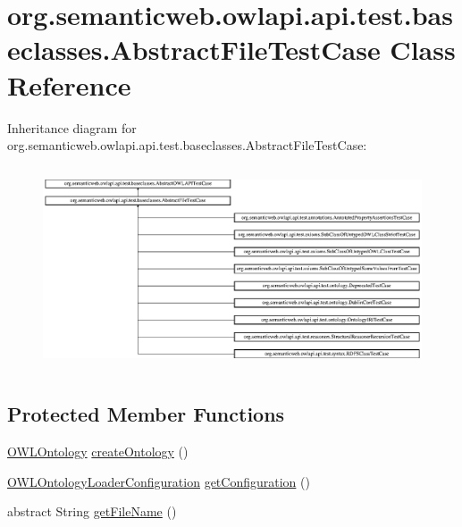 \hypertarget{classorg_1_1semanticweb_1_1owlapi_1_1api_1_1test_1_1baseclasses_1_1_abstract_file_test_case}{\section{org.\-semanticweb.\-owlapi.\-api.\-test.\-baseclasses.\-Abstract\-File\-Test\-Case Class Reference}
\label{classorg_1_1semanticweb_1_1owlapi_1_1api_1_1test_1_1baseclasses_1_1_abstract_file_test_case}
}
Inheritance diagram for org.\-semanticweb.\-owlapi.\-api.\-test.\-baseclasses.\-Abstract\-File\-Test\-Case\-:\begin{figure}[H]
\begin{center}
\leavevmode
\includegraphics[height=6.051081cm]{classorg_1_1semanticweb_1_1owlapi_1_1api_1_1test_1_1baseclasses_1_1_abstract_file_test_case}
\end{center}
\end{figure}
\subsection*{Protected Member Functions}
\begin{DoxyCompactItemize}
\item 
\hyperlink{interfaceorg_1_1semanticweb_1_1owlapi_1_1model_1_1_o_w_l_ontology}{O\-W\-L\-Ontology} \hyperlink{classorg_1_1semanticweb_1_1owlapi_1_1api_1_1test_1_1baseclasses_1_1_abstract_file_test_case_ada0f75fd23a5d611869498dd6be5f766}{create\-Ontology} ()
\item 
\hyperlink{classorg_1_1semanticweb_1_1owlapi_1_1model_1_1_o_w_l_ontology_loader_configuration}{O\-W\-L\-Ontology\-Loader\-Configuration} \hyperlink{classorg_1_1semanticweb_1_1owlapi_1_1api_1_1test_1_1baseclasses_1_1_abstract_file_test_case_ac7423d947973810bcc43a128df330dba}{get\-Configuration} ()
\item 
abstract String \hyperlink{classorg_1_1semanticweb_1_1owlapi_1_1api_1_1test_1_1baseclasses_1_1_abstract_file_test_case_aecb03c68ab9e814e3d76d4e4959d85ca}{get\-File\-Name} ()
\end{DoxyCompactItemize}
